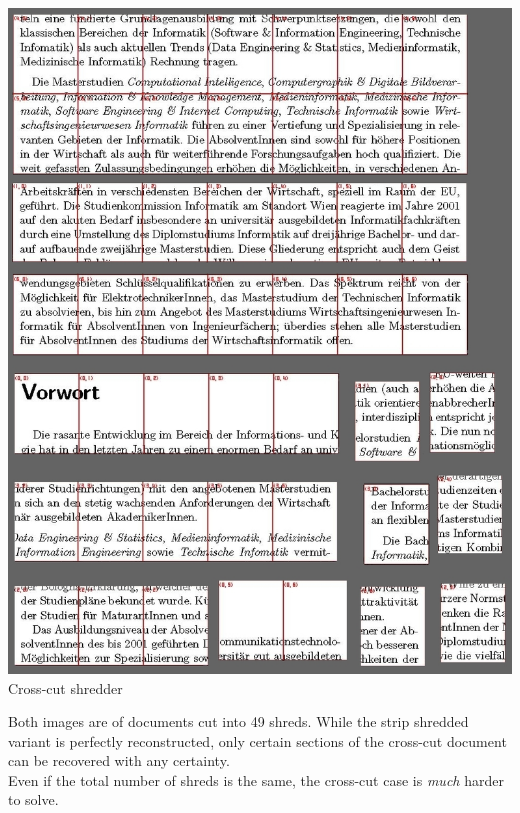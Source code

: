 \documentclass[portrait,final,a0paper,fontscale=0.277]{baposter}
\begin{document}
\begin{poster}
{\begin{minipage}[t]{0.4\linewidth}
    \begin{minipage}[t]{\linewidth}
      \centering
      \includegraphics[width=\textwidth]{cc49Grey}
      \smaller Cross-cut shredder
    \end{minipage}
  \end{minipage}
  \begin{minipage}[c]{0.57\linewidth}
     	\raggedright Both images are of documents cut into 49 shreds. While the strip shredded variant is perfectly reconstructed, only certain sections of the cross-cut document can be recovered with any certainty. \vspace{1em} \\ Even if the total number of shreds is the same, the cross-cut case is \emph{much} harder to solve.
  \end{minipage}
}


\end{poster}
\end{document}
